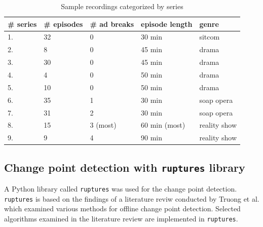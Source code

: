 \begin{table}[h]
    \begin{center}
    \begin{tabular}{|p{15mm}|p{20mm}|p{22mm}|p{28mm}|p{30mm}|} %
        \hline
        \textbf{\# series} & \textbf{\# episodes} & \textbf{\# ad breaks} & \textbf{episode length} & \textbf{genre}  \\ \hline
        1. & 32 & 0 & 30 min & sitcom\\ \hline
        2. &  8 & 0 & 45 min & drama\\ \hline
        3. & 30 & 0 & 45 min & drama\\ \hline
        4. & 4  & 0 & 50 min & drama\\ \hline
        5. & 10 & 0 & 50 min & drama\\ \hline
        6. & 35 & 1 & 30 min & soap opera\\ \hline
        7. & 31 & 2 & 30 min & soap opera\\ \hline
        8. & 15 & 3 (most) & 60 min (most) & reality show\\ \hline
        9. &  9 & 4 & 90 min & reality show\\ \hline
    \end{tabular}
    \end{center}
    \caption{Sample recordings categorized by series}
    \label{tab:data}
\end{table}

\subsection{Change point detection with \texttt{ruptures} library} \label{subsec:solution}

A Python library called \texttt{ruptures} was used for the change point detection. \texttt{ruptures} is based on the findings of a literature reviw conducted by Truong et al. \cite{truongSelectiveReviewOffline2020} which examined various methods for offline change point detection. Selected algorithms examined in the literature review are implemented in \texttt{ruptures}.


